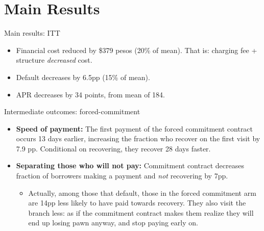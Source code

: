 \documentclass[8pt]{beamer}
\begin{document}
\section{Main Results}
\begin{frame}{Main results: ITT}
\label{main_results}


\begin{itemize}
    \item Financial cost reduced by \$379 pesos (20\% of mean). That is: charging fee + structure \textit{decreased} cost.
    \item Default decreases by 6.5pp (15\% of mean).
    \item APR decreases by 34 points, from mean of 184.
\end{itemize}
\vspace{.3in}
\begin{table}[H]
\begin{center}
\resizebox{0.95\textwidth}{!}{
\small{}
}
\end{center}
\end{table}

   \vfill 
  \hyperlink{several_def_cost}{}

\end{frame}




\begin{frame}{Intermediate outcomes: forced-commitment}
\label{intermediate_outcomes}
 \begin{itemize}
     \item \vfill \textbf{Speed of payment:} The first payment of the forced commitment contract  occurs 13 days earlier, increasing the fraction who recover on the first visit by 7.9 pp. Conditional on recovering, they recover 28 days faster.
     
    \item \vfill \textbf{Separating those who will not pay:} Commitment contract decreases fraction of borrowers making a payment and \textit{not} recovering by 7pp.
    \begin{itemize}
        \item Actually, among those that default, those in the forced commitment arm are 14pp less likely to have paid towards recovery. They also visit the branch less: as if the commitment contract makes them realize they will end up losing pawn anyway, and stop paying early on.
    \end{itemize}
    \end{itemize}

   \vfill
   
   \hyperlink{mechanism_appendix}{}
\end{frame}
\end{document}
